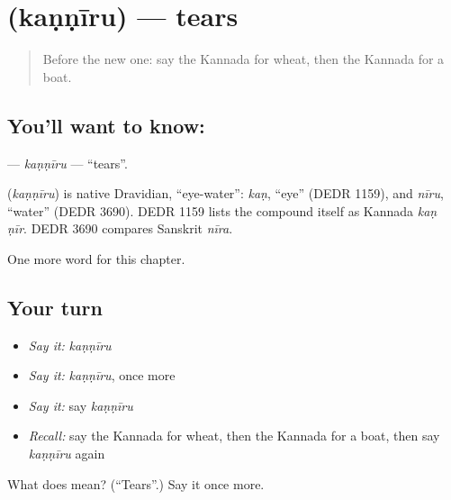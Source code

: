 \section[\texorpdfstring{\kn{ಕಣ್ಣೀರು} (kaṇṇīru)}{ಕಣ್ಣೀರು (kaṇṇīru)}]{ (kaṇṇīru) — tears}

\label{lesson:KA-C139-kanniru}



\begin{quote}
Before the new one: say the Kannada for wheat, then the Kannada for a boat.
\end{quote}

\subsection*{You'll want to know: }
\textbf{} — \emph{kaṇṇīru} — \textquotedblleft{}tears\textquotedblright{}.

\begin{cousinweb}
\textbf{} (\emph{kaṇṇīru}) is native Dravidian, \textquotedblleft{}eye-water\textquotedblright{}: \emph{kaṇ}, \textquotedblleft{}eye\textquotedblright{} (DEDR 1159), and \emph{nīru}, \textquotedblleft{}water\textquotedblright{} (DEDR 3690). DEDR 1159 lists the compound itself as Kannada \emph{kaṇ ṇīr}. DEDR 3690 compares Sanskrit \emph{nīra}.
\end{cousinweb}

\begin{grammarlens}[title={What you've built}]
One more word for this chapter.
\end{grammarlens}

\subsection*{Your turn}
\begin{itemize}
\raggedright
  \item \emph{Say it:} \emph{kaṇṇīru}
  \item \emph{Say it:} \emph{kaṇṇīru}, once more
  \item \emph{Say it:} say \emph{kaṇṇīru}
  \item \emph{Recall:} say the Kannada for wheat, then the Kannada for a boat, then say \emph{kaṇṇīru} again
\end{itemize}

\begin{tcolorbox}[breakable,colback=teal!4,colframe=teal!35!black,title={Before you move on}]
What does  mean? (\textquotedblleft{}Tears\textquotedblright{}.) Say it once more.
\end{tcolorbox}
